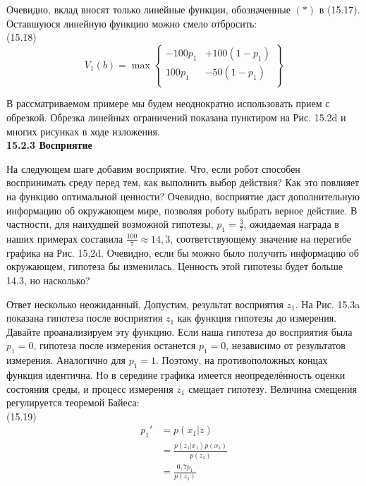 \documentclass[10pt,a4paper]{article}
\begin{document}
Очевидно, вклад вносят только линейные функции, обозначенные $(\ast)$ в (15.17). Оставшуюся линейную функцию можно смело отбросить:\\

(15.18)
\begin{equation*}
V_1(b)=\max\left\{
\begin{array}{rr}
-100p_1&+100(1-p_1)\\
100p_1&-50(1-p_1)\\
\end{array}
\right\}
\end{equation*}

В рассматриваемом примере мы будем неоднократно использовать прием с обрезкой. Обрезка линейных ограничений показана пунктиром на Рис. 15.2d и многих рисунках в ходе изложения.\\

\textbf{15.2.3	Восприятие}

На следующем шаге добавим восприятие. Что, если робот способен воспринимать среду перед тем, как выполнить выбор действия? Как это повлияет на функцию оптимальной ценности? Очевидно, восприятие даст дополнительную информацию об окружающем мире, позволяя роботу выбрать верное действие. В частности, для наихудшей возможной гипотезы, $p_1 = \frac{3}{7}$, ожидаемая награда в наших примерах составила  $\frac{100}{7}\approx 14,3$, соответствующему значение на перегибе графика на Рис. 15.2d. Очевидно, если бы можно было получить информацию об окружающем, гипотеза бы изменилась. Ценность этой гипотезы будет больше 14,3, но насколько?

Ответ несколько неожиданный. Допустим, результат восприятия $z_1$. На Рис. 15.3a показана гипотеза после восприятия $z_1$ как функция гипотезы до измерения. Давайте проанализируем эту функцию. Если наша гипотеза до восприятия была $p_1 = 0$, гипотеза после измерения останется  $p_1 = 0$, независимо от результатов измерения. Аналогично для $p_1 = 1$. Поэтому, на противоположных концах функция идентична. Но в середине графика имеется неопределённость оценки состояния среды, и процесс измерения $z_1$ смещает гипотезу. Величина смещения регулируется теоремой Байеса:\\

(15.19)
\begin{equation*}
\begin{split}
p_1'&=p(x_1|z)\\
&=\frac{p(z_1|x_1)p(x_1)}{p(z_1)}\\
&=\frac{0,7p_1}{p(z_1)}
\end{split}
\end{equation*}
\end{document}
